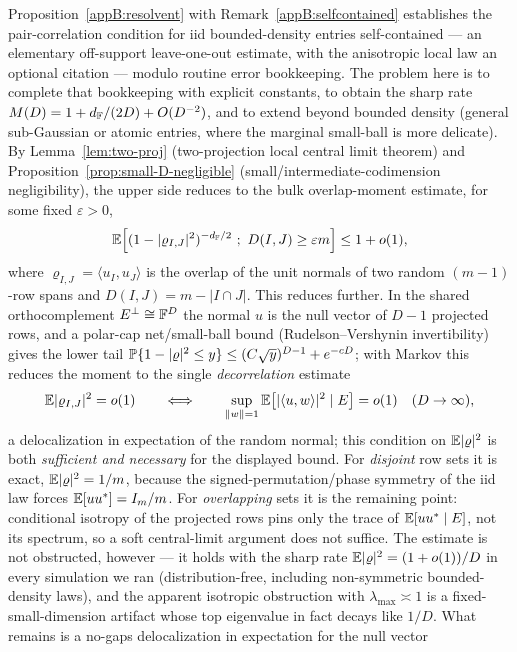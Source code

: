 \begin{problem}\label{prob:pc}
Proposition~\ref{appB:resolvent} with Remark~\ref{appB:selfcontained} establishes the pair-correlation
condition for iid bounded-density entries self-contained --- an elementary off-support leave-one-out
estimate, with the anisotropic local law \cite{BEKYY2014,KnowlesYin2017} an optional citation ---
modulo routine error bookkeeping.  The problem here is to complete that bookkeeping with explicit
constants, to obtain the sharp rate \(M(D)=1+d_{\mathbb{F}}/(2D)+O(D^{-2})\), and to extend beyond bounded
density (general sub-Gaussian or atomic entries, where the marginal small-ball is more delicate).  By
Lemma~\ref{lem:two-proj} (two-projection local central limit theorem) and
Proposition~\ref{prop:small-D-negligible} (small/intermediate-codimension
negligibility), the upper side reduces to the bulk overlap-moment estimate, for
some fixed \(\varepsilon>0\),
\[
  \EE\!\left[(1-|\varrho_{I,J}|^2)^{-d_\F/2}\ ;\ D(I,J)\ge\varepsilon m\right]\le 1+o(1),
\]
where $\varrho_{I,J}=\langle u_I,u_J\rangle$ is the overlap of the unit normals of two
random $(m-1)$-row spans and $D(I,J)=m-|I\cap J|$.  This reduces further.  In the
shared orthocomplement $E^\perp\cong\mathbb{F}^D$ the normal $u$ is the null vector of
$D-1$ projected rows, and a polar-cap net/small-ball bound (Rudelson--Vershynin
invertibility) gives the lower tail
\(\mathbb{P}\{1-|\varrho|^2\le y\}\le (C\sqrt y)^{D-1}+e^{-cD}\); with Markov this reduces
the moment to the single \emph{decorrelation} estimate
\[
  \mathbb{E}|\varrho_{I,J}|^2=o(1)\qquad\Longleftrightarrow\qquad
  \sup_{\|w\|=1}\mathbb{E}\big[|\langle u,w\rangle|^2\mid E\big]=o(1)\quad(D\to\infty),
\]
a delocalization in expectation of the random normal; this condition on
$\mathbb{E}|\varrho|^2$ is both \emph{sufficient and necessary} for the displayed bound.  For
\emph{disjoint} row sets it is exact, $\mathbb{E}|\varrho|^2=1/m$, because the signed-permutation/phase
symmetry of the iid law forces $\mathbb{E}[uu^*]=I_m/m$.  For \emph{overlapping} sets it is the remaining
point: conditional isotropy of the projected rows pins only the trace of $\mathbb{E}[uu^*\mid E]$, not its
spectrum, so a soft central-limit argument does not suffice.  The estimate is not obstructed,
however --- it holds with the sharp rate $\mathbb{E}|\varrho|^2=(1+o(1))/D$ in every simulation we ran
(distribution-free, including non-symmetric bounded-density laws), and the apparent isotropic
obstruction with $\lambda_{\max}\asymp1$ is a fixed-small-dimension artifact whose top eigenvalue in
fact decays like $1/D$.  What remains is a no-gaps delocalization in expectation for the null vector

\end{problem}
